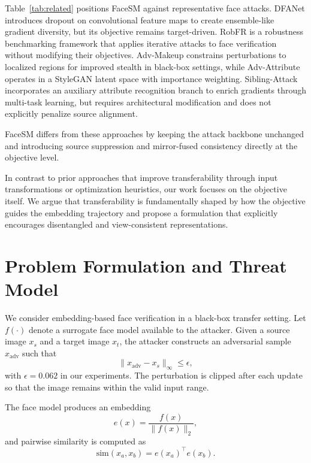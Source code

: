 \documentclass[a4paper,fleqn]{cas-dc}
\begin{document}
Table~\ref{tab:related} positions FaceSM against representative face attacks. DFANet introduces dropout on convolutional feature maps to create ensemble-like gradient diversity, but its objective remains target-driven. RobFR is a robustness benchmarking framework that applies iterative attacks to face verification without modifying their objectives. Adv-Makeup constrains perturbations to localized regions for improved stealth in black-box settings, while Adv-Attribute operates in a StyleGAN latent space with importance weighting. Sibling-Attack incorporates an auxiliary attribute recognition branch to enrich gradients through multi-task learning, but requires architectural modification and does not explicitly penalize source alignment. 

FaceSM differs from these approaches by keeping the attack backbone unchanged and introducing source suppression and mirror-fused consistency directly at the objective level.

In contrast to prior approaches that improve transferability through input transformations or optimization heuristics, our work focuses on the objective itself. We argue that transferability is fundamentally shaped by how the objective guides the embedding trajectory and propose a formulation that explicitly encourages disentangled and view-consistent representations.


\section{Problem Formulation and Threat Model}

We consider embedding-based face verification in a black-box transfer setting. Let $f(\cdot)$ denote a surrogate face model available to the attacker. Given a source image $x_s$ and a target image $x_t$, the attacker constructs an adversarial sample $x_{\mathrm{adv}}$ such that
\begin{equation}
\|x_{\mathrm{adv}} - x_s\|_\infty \leq \epsilon,
\end{equation}
with $\epsilon = 0.062$ in our experiments. The perturbation is clipped after each update so that the image remains within the valid input range.

The face model produces an embedding
\begin{equation}
e(x) = \frac{f(x)}{\|f(x)\|_2},
\end{equation}
and pairwise similarity is computed as
\begin{equation}
\mathrm{sim}(x_a, x_b) = e(x_a)^\top e(x_b).
\end{equation}
\end{document}
